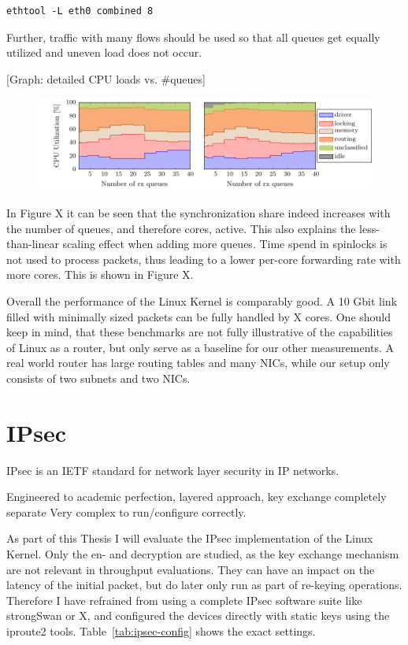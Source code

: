 \documentclass[IN,11pt,twoside,openright,master,english]{tumthesis}
\begin{document}
\begin{lstlisting}[caption={Command to configure 8 RXTX queues on a NIC},captionpos=b,label={lst:include-fix}]
ethtool -L eth0 combined 8
\end{lstlisting}

Further, traffic with many flows should be used so that all queues get equally utilized and uneven load does not occur.

[Graph: detailed CPU loads vs. \#queues]
\begin{figure}[h]
	\centering
	\includegraphics[width=1\linewidth]{figures/linux_spinlock_60_bytes}
	\caption{}
	\label{fig:linuxspinlock60bytes}
\end{figure}



In Figure X it can be seen that the synchronization share indeed increases with the number of queues, and therefore cores, active. This also explains the less-than-linear scaling effect when adding more queues. Time spend in spinlocks is not used to process packets, thus leading to a lower per-core forwarding rate with more cores. This is shown in Figure X.


Overall the performance of the Linux Kernel is comparably good. A 10 Gbit link filled with minimally sized packets can be fully handled by X cores. One should keep in mind, that these benchmarks are not fully illustrative of the capabilities of Linux as a router, but only serve as a baseline for our other measurements. A real world router has large routing tables and many NICs, while our setup only consists of two subnets and two NICs.

\section{IPsec}

IPsec is an IETF standard for network layer security in IP networks.

Engineered to academic perfection, layered approach, key exchange completely separate
Very complex to run/configure correctly. 

As part of this Thesis I will evaluate the IPsec implementation of the Linux Kernel. 
Only the en- and decryption are studied, as the key exchange mechanism are not relevant in throughput evaluations. They can have an impact on the latency of the initial packet, but do later only run as part of re-keying operations. Therefore I have refrained from using a complete IPsec software suite like strongSwan or X, and configured the devices directly with static keys using the iproute2 tools. Table~\ref{tab:ipsec-config} shows the exact settings.
\end{document}

